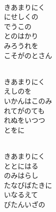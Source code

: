\documentclass[10pt,b5j]{tarticle} %
\begin{document}
\vspace{1.5em} %
\newcommand{\linespace}{0.5em} %
\newcommand{\blocksize}{0.5\hsize} %
\newcommand{\itemmargin}{6em} %
\begin{enumerate} %
    \setlength{\itemindent}{\itemmargin} %
    \begin{minipage}[c]{\blocksize}
    
        \vspace{\linespace}
        \item~\\
        きあまりにく\\
        にせしくの\\
        でうこの\\
        とのはかり\\
        みろうれを\\
        こそがのとさん
        
        \vspace{\linespace}
        \item~\\
        きあまりにく\\
        えしのを\\
        いかんはこのみ\\
        れてがのても\\
        れぬをいつつ\\
        とをに
        
        \vspace{\linespace}
        \item~\\
        きあまりにく\\
        ととにはる\\
        のみはらし\\
        たなびばたきに\\
        いなるえて\\
        びたんいざの
    
    \end{minipage}
\end{enumerate} %
\end{document}

